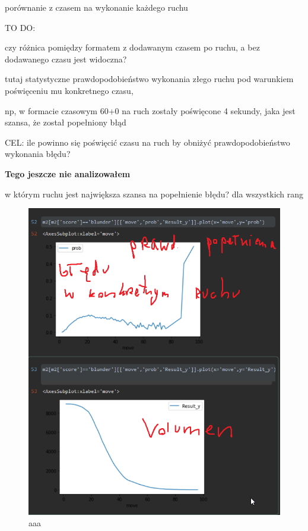 \documentclass[inzynierska]{pwr_wmat_praca_dyplomowa}
\theoremstyle{plain}
\numberwithin{theorem}{chapter}
\theoremstyle{definition}
\numberwithin{theorem}{chapter}
\begin{document}
porównanie z czasem na wykonanie każdego ruchu\newline



TO DO: 

czy różnica pomiędzy formatem z dodawanym czasem po ruchu, a bez dodawanego czasu jest widoczna?




tutaj statystyczne prawdopodobieństwo wykonania złego ruchu pod warunkiem poświęceniu mu konkretnego czasu,\newline

np, w formacie czasowym 60+0 na ruch zostały poświęcone 4 sekundy, jaka jest szansa, że został popełniony błąd \newline


CEL: 
ile powinno się poświęcić czasu na ruch by obniżyć prawdopodobieństwo wykonania błędu?\newline


\textbf{Tego jeszcze nie analizowałem}



w którym ruchu jest największa szansa na popełnienie błędu?
dla wszystkich rang
\begin{figure}[H]
	\centering
	\includegraphics[width=\textwidth]{p_od_ruchu.png}
	\caption{aaa}\label{aaa}
\end{figure}
\end{document}
